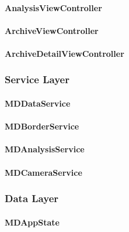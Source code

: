         \paragraph{AnalysisViewController}
            
        \paragraph{ArchiveViewController}
            
        \paragraph{ArchiveDetailViewController}
            

    \subsubsection{Service Layer}
        \paragraph{MDDataService}
            
        \paragraph{MDBorderService}
            
        \paragraph{MDAnalysisService}
            
        \paragraph{MDCameraService}
            


    \subsubsection{Data Layer}

        \paragraph{MDAppState}
            
